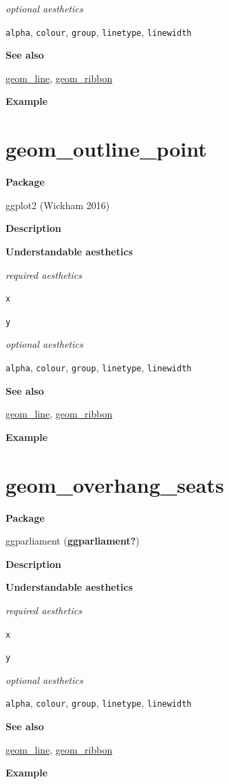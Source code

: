 \documentclass[
  letterpaper,
  DIV=11,
  numbers=noendperiod]{scrreprt}
\begin{document}
\emph{optional aesthetics}

\texttt{alpha}, \texttt{colour}, \texttt{group}, \texttt{linetype},
\texttt{linewidth}

\textbf{See also}

\hyperref[line]{geom\_line}, \hyperref[ribbon]{geom\_ribbon}

\textbf{Example}

\section{geom\_outline\_point}\label{outline_point}

\textbf{Package}

ggplot2 (Wickham 2016)

\textbf{Description}

\textbf{Understandable aesthetics}

\emph{required aesthetics}

\texttt{x}

\texttt{y}

\emph{optional aesthetics}

\texttt{alpha}, \texttt{colour}, \texttt{group}, \texttt{linetype},
\texttt{linewidth}

\textbf{See also}

\hyperref[line]{geom\_line}, \hyperref[ribbon]{geom\_ribbon}

\textbf{Example}

\section{geom\_overhang\_seats}\label{overhang_seats}

\textbf{Package}

ggparliament (\textbf{ggparliament?})

\textbf{Description}

\textbf{Understandable aesthetics}

\emph{required aesthetics}

\texttt{x}

\texttt{y}

\emph{optional aesthetics}

\texttt{alpha}, \texttt{colour}, \texttt{group}, \texttt{linetype},
\texttt{linewidth}

\textbf{See also}

\hyperref[line]{geom\_line}, \hyperref[ribbon]{geom\_ribbon}

\textbf{Example}
\end{document}
